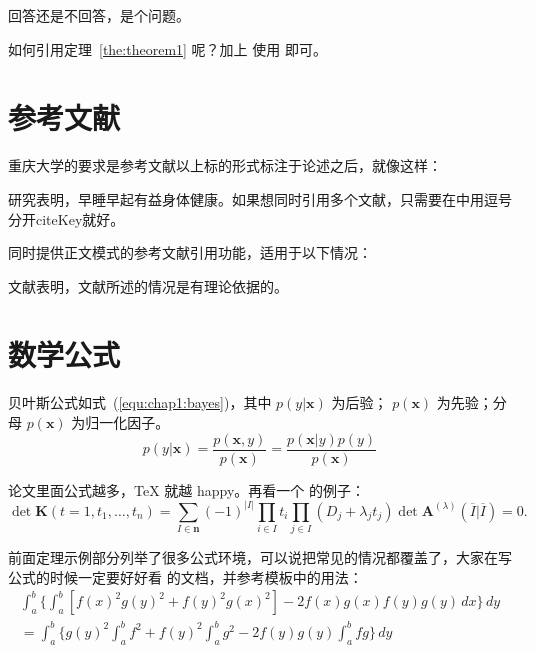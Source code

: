 \begin{problem}
	回答还是不回答，是个问题。 
\end{problem}

如何引用定理~\ref{the:theorem1} 呢？加上  使用  即可。

\section{参考文献}
\label{sec:bib}
重庆大学的要求是参考文献以上标的形式标注于论述之后，就像这样：

研究表明\cite{r1}，早睡早起有益身体健康。如果想同时引用多个文献\cite{r2,r3,r4,r6}，只需要在中用逗号分开\textsf{citeKey}就好。

\PRCthesis 同时提供正文模式的参考文献引用功能，适用于以下情况：

文献表明，文献所述的情况是有理论依据的。

\section{数学公式}
\label{sec:equation}
贝叶斯公式如式~(\ref{equ:chap1:bayes})，其中 $p(y|\mathbf{x})$ 为后验；
$p(\mathbf{x})$ 为先验；分母 $p(\mathbf{x})$ 为归一化因子。
\begin{equation}
\label{equ:chap1:bayes}
p(y|\mathbf{x}) = \frac{p(\mathbf{x},y)}{p(\mathbf{x})}=
\frac{p(\mathbf{x}|y)p(y)}{p(\mathbf{x})} 
\end{equation}

论文里面公式越多，\TeX{} 就越 happy。再看一个  的例子：
\newcommand{\envert}[1]{\left\lvert#1\right\rvert} 
\begin{equation}\label{detK2}
\det\mathbf{K}(t=1,t_1,\dots,t_n)=\sum_{I\in\mathbf{n}}(-1)^{\envert{I}}
\prod_{i\in I}t_i\prod_{j\in I}(D_j+\lambda_jt_j)\det\mathbf{A}
^{(\lambda)}(\overline{I}|\overline{I})=0.
\end{equation} 

前面定理示例部分列举了很多公式环境，可以说把常见的情况都覆盖了，大家在写公式的时候一定要好好看  的文档，并参考模板中的用法：
\begin{multline*}%
\int_a^b\biggl\{\int_a^b[f(x)^2g(y)^2+f(y)^2g(x)^2]
-2f(x)g(x)f(y)g(y)\,dx\biggr\}\,dy \\
=\int_a^b\biggl\{g(y)^2\int_a^bf^2+f(y)^2
\int_a^b g^2-2f(y)g(y)\int_a^b fg\biggr\}\,dy
\end{multline*}

